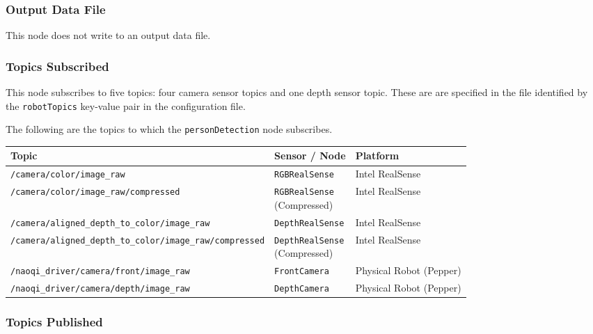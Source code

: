 \documentclass{CSSRforAfrica}
\begin{document}
{{\subsubsection*{Output Data File}
This node does not write to an output data file.


\subsubsection*{Topics Subscribed}
This node  subscribes to five topics: four camera sensor topics and one depth sensor topic. 
These are are specified in the file identified by the {\small \verb+robotTopics+ }   key-value pair in the configuration file.

The following are the topics to which the {\small \verb+personDetection+} node subscribes.

\begin{table}[!h]
	\centering
	{\fontsize{8.2}{11.0}\selectfont %
		\begin{tabularx}{\linewidth}{| l | l | X |}
			\hline
			\small{Topic} & \small{Sensor / Node} & \small{Platform} \\
			\hline
			\texttt{/camera/color/image\_raw} & \texttt{RGBRealSense} & Intel RealSense \\
			\hline
			\texttt{/camera/color/image\_raw/compressed} & \makecell[l]{\texttt{RGBRealSense} \\ (Compressed)} & Intel RealSense \\
			\hline
			\texttt{/camera/aligned\_depth\_to\_color/image\_raw} & \texttt{DepthRealSense} & Intel RealSense \\
			\hline
			\texttt{/camera/aligned\_depth\_to\_color/image\_raw/compressed} & \makecell[l]{\texttt{DepthRealSense} \\ (Compressed)} & Intel RealSense \\
			\hline
			\texttt{/naoqi\_driver/camera/front/image\_raw} & \texttt{FrontCamera} & Physical Robot (Pepper) \\
			\hline
			\texttt{/naoqi\_driver/camera/depth/image\_raw} & \texttt{DepthCamera} & Physical Robot (Pepper) \\
			\hline
		\end{tabularx}
	}
\end{table}

\subsubsection*{Topics Published}

}}
\end{document}
